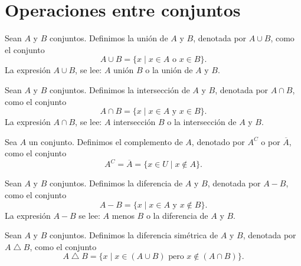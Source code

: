 \newpage

\section{Operaciones entre conjuntos}

\begin{definicion}{}{}
    Sean $A$ y $B$ conjuntos. Definimos la unión de $A$ y $B$, denotada por $A \cup B$, como el conjunto
    $$A \cup B=\{x \mid x \in A \text { o } x \in B\}.$$
    La expresión $A \cup B$, se lee: $A$ unión $B$ o la unión de $A$ y $B$.
\end{definicion}

\begin{definicion}{}{}
    Sean $A$ y $B$ conjuntos. Definimos la intersección de $A$ y $B$, denotada por $A \cap B$, como el conjunto
    $$A \cap B=\{x \mid x \in A \text { y } x \in B\}.$$
    La expresión $A \cap B$, se lee: $A$ intersección $B$ o la intersección de $A$ y $B$.
\end{definicion}

\begin{definicion}{}{}
    Sea $A$ un conjunto. Definimos el complemento de $A$, denotado por $A^C$ o por $\overline{A}$, como el conjunto
    $$A^C = \overline{A} = \{x \in U\mid x \notin A \}.$$
\end{definicion}

\begin{definicion}{}{}
    Sean $A$ y $B$ conjuntos. Definimos la diferencia de $A$ y $B$, denotada por $A - B$, como el conjunto
    $$A - B = \{x \mid x \in A \text { y } x \notin B\}.$$
    La expresión $A - B$ se lee: $A$ menos $B$ o la diferencia de $A$ y $B$.
\end{definicion}

\begin{definicion}{}{}
    Sean $A$ y $B$ conjuntos. Definimos la diferencia simétrica de $A$ y $B$, denotada por $A \bigtriangleup B$, como el conjunto
    $$A \bigtriangleup B = \{x \mid x \in (A \cup B) \text { pero } x \notin (A \cap B)\}.$$
\end{definicion}

